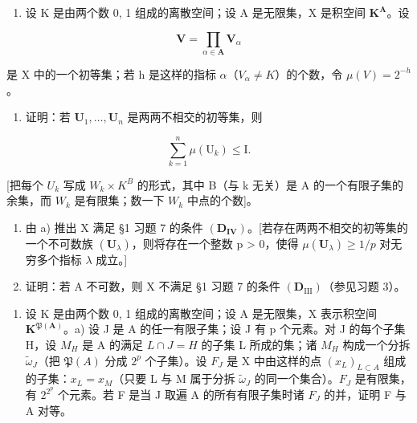 \begin{enumerate}
\def\labelenumi{\arabic{enumi})}
\setcounter{enumi}{3}
\tightlist
\item
  设 K 是由两个数 0, 1 组成的离散空间；设 A 是无限集，X 是积空间 \(\mathbf{K}^{\mathbf{A}}\)。设
\end{enumerate}

\[
\mathbf {V} = \prod_ {\alpha \in \mathbf {A}} \mathbf {V} _ {\alpha}
\]

是 X 中的一个初等集；若 h 是这样的指标 \(\alpha\)（\(V_{\alpha} \neq K\)）的个数，令 \(\mu(V) = 2^{-h}\)。

\begin{enumerate}
\def\labelenumi{\alph{enumi})}
\tightlist
\item
  证明：若 \(\mathbf{U}_1, \ldots, \mathbf{U}_n\) 是两两不相交的初等集，则
\end{enumerate}

\[
\sum_ {k = 1} ^ {n} \mu (\mathrm{U} _ {k}) \leqslant \mathrm{I}.
\]

{[}把每个 \(U_{k}\) 写成 \(W_{k} \times K^{B}\) 的形式，其中 B（与 k 无关）是 A 的一个有限子集的余集，而 \(W_{k}\) 是有限集；数一下 \(W_{k}\) 中点的个数{]}。

\begin{enumerate}
\def\labelenumi{\alph{enumi})}
\setcounter{enumi}{1}
\item
  由 a) 推出 X 满足 §1 习题 7 的条件 \((\mathbf{D}_{\mathbf{IV}})\)。{[}若存在两两不相交的初等集的一个不可数族 \((\mathbf{U}_{\lambda})\)，则将存在一个整数 p \textgreater{} 0，使得 \(\mu(\mathbf{U}_{\lambda}) \geqslant 1/p\) 对无穷多个指标 \(\lambda\) 成立。{]}
\item
  证明：若 A 不可数，则 X 不满足 §1 习题 7 的条件 \((\mathbf{D}_{\mathrm{III}})\)（参见习题 3）。
\end{enumerate}

\begin{enumerate}
\def\labelenumi{\arabic{enumi})}
\setcounter{enumi}{4}
\tightlist
\item
  设 K 是由两个数 0, 1 组成的离散空间；设 A 是无限集，X 表示积空间 \(\mathbf{K}^{\mathfrak{P}(\mathbf{A})}\)。a) 设 J 是 A 的任一有限子集；设 J 有 p 个元素。对 J 的每个子集 H，设 \(M_{H}\) 是 A 的满足 \(L \cap J = H\) 的子集 L 所成的集；诸 \(M_{H}\) 构成一个分拆 \(\tilde{\omega}_{J}\)（把 \(\mathfrak{P}(A)\) 分成 \(2^{p}\) 个子集）。设 \(F_{J}\) 是 X 中由这样的点 \((x_{L})_{L \subset A}\) 组成的子集：\(x_{L} = x_{M}\)（只要 L 与 M 属于分拆 \(\tilde{\omega}_{J}\) 的同一个集合）。\(F_{J}\) 是有限集，有 \(2^{2^{p}}\) 个元素。若 F 是当 J 取遍 A 的所有有限子集时诸 \(F_{J}\) 的并，证明 F 与 A 对等。
\end{enumerate}

